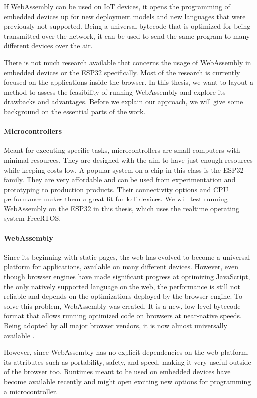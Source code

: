 If WebAssembly can be used on IoT devices, it opens the programming of embedded devices up for new deployment models and new languages that were previously not supported. Being a universal bytecode that is optimized for being transmitted over the network, it can be used to send the same program to many different devices over the air.

There is not much research available that concerns the usage of WebAssembly in embedded devices or the ESP32 specifically. Most of the research is currently focused on the applications inside the browser. In this thesis, we want to layout a method to assess the feasibility of running WebAssembly and explore its drawbacks and advantages. Before we explain our approach, we will give some background on the essential parts of the work. 

\paragraph{Microcontrollers}
Meant for executing specific tasks, microcontrollers are small computers with minimal resources. They are designed with the aim to have just enough resources while keeping costs low. A popular system on a chip in this class is the ESP32 family. They are very affordable and can be used from experimentation and prototyping to production products. Their connectivity options and CPU performance makes them a great fit for IoT devices. We will test running WebAssembly on the ESP32 in this thesis, which uses the realtime operating system FreeRTOS.

\paragraph{WebAssembly}
Since its beginning with static pages, the web has evolved to become a universal platform for applications, available on many different devices. However, even though browser engines have made significant progress at optimizing JavaScript, the only natively supported language on the web, the performance is still not reliable and depends on the optimizations deployed by the browser engine. To solve this problem, WebAssembly was created. It is a new, low-level bytecode format that allows running optimized code on browsers at near-native speeds. Being adopted by all major browser vendors, it is now almost universally available \autocite{deveria_can_nodate}.

However, since WebAssembly has no explicit dependencies on the web platform, its attributes such as portability, safety, and speed, making it very useful outside of the browser too. Runtimes meant to be used on embedded devices have become available recently and might open exciting new options for programming a microcontroller.

